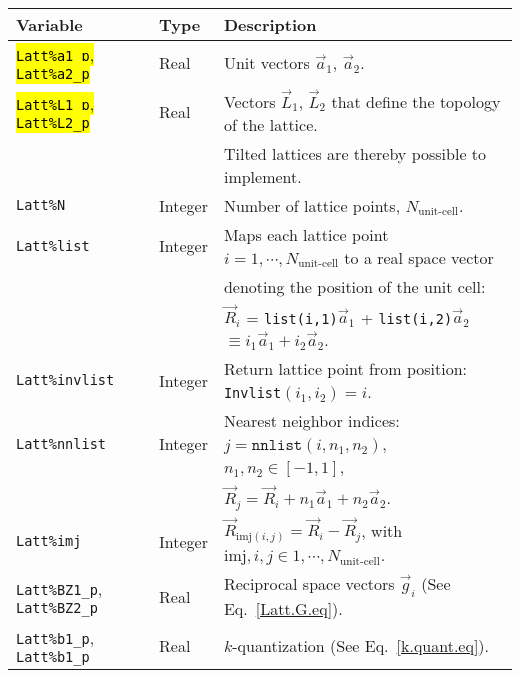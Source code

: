 %
\begin{table}[h]
   \begin{tabular}{@{} l l l @{}}\toprule
    Variable  & Type & Description \\\midrule
     \hl{\texttt{Latt\%a1\_p}, \texttt{Latt\%a2\_p}}   & Real     & Unit vectors $\vec{a}_1$,  $\vec{a}_2$. \\ 
     \hl{\texttt{Latt\%L1\_p}, \texttt{Latt\%L2\_p}}   & Real     & Vectors $\vec{L}_1$, $\vec{L}_2$ that define the topology of the  lattice. \\
     									  &              &  Tilted lattices are  thereby possible to implement.  \\
    \texttt{Latt\%N}                                                 &   Integer &  Number of lattice points, $N_{\text{unit-cell}}$.   \\
    \texttt{Latt\%list}                                               & Integer &  Maps each lattice point $i=1,\cdots, N_{\text{unit-cell}}$ to a real space vector\\ 
                                                                             &   &  denoting the position of the unit cell: \\
                                                                             &   & $\vec{R}_i$ = \texttt{list(i,1)}$\vec{a}_1$ + \texttt{list(i,2)}$\vec{a}_2$  $  \equiv i_1  \vec{a}_1 + i_2  \vec{a}_2 $. \\
    \texttt{Latt\%invlist}                                        &  Integer &   Return lattice point from position: \texttt{Invlist}$(i_1,i_2) = i $. \\
    \texttt{Latt\%nnlist}                                         &  Integer &  Nearest neighbor indices: $j = \texttt{nnlist} (i, n_1, n_2) $,  $n_1, n_2 \in [-1,1] $, \\
                                                                           &              &    $\vec{R}_j = \vec{R}_i + n_1 \vec{a}_1  + n_2 \vec{a}_2 $. \\
   \texttt{Latt\%imj}                                             &   Integer  &  $\vec{R}_{\mathrm{imj}(i,j)}  =  \vec{R}_i -  \vec{R}_j$, with  $\mathrm{imj}, i, j \in  1,\cdots, N_{\text{unit-cell}}$.\\
    \texttt{Latt\%BZ1\_p}, \texttt{Latt\%BZ2\_p}  &   Real     & Reciprocal space vectors $\vec{g}_i$   (See Eq.~\ref{Latt.G.eq}).\\
    \texttt{Latt\%b1\_p}, \texttt{Latt\%b1\_p}       &   Real     &  $k$-quantization (See Eq.~\ref{k.quant.eq}). \\

\end{tabular}
\end{table}
